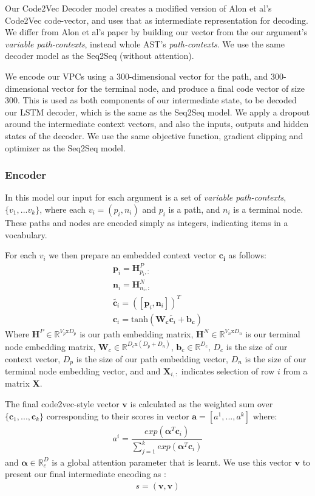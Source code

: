 Our Code2Vec Decoder model creates a modified version of Alon et al's \cite{alon_code2vec_2018} Code2Vec code-vector, and uses that as intermediate representation for decoding. We differ from Alon et al's paper by building our vector from the our argument's \textit{variable path-contexts}, instead whole AST's \textit{path-contexts}.
We use the same decoder model as the Seq2Seq (without attention).

We encode our VPCs using a 300-dimensional vector for the path, and 300-dimensional vector for the terminal node, and produce a final code vector of size 300.
This is used as both components of our intermediate state, to be decoded our LSTM decoder, which is the same as the Seq2Seq model.
We apply a dropout around the intermediate context vectors, and also the inputs, outputs and hidden states of the decoder. 
We use the same objective function, gradient clipping and optimizer as the Seq2Seq model.

\subsubsection{Encoder}

In this model our input for each argument is a set of \textit{variable path-contexts}, $\{v_1,...v_k\}$, where each $v_i = (p_i, n_i)$ and  $p_i$ is a path, and $n_i$ is a terminal node. These paths and nodes are encoded simply as integers, indicating items in a vocabulary.

For each $v_i$ we then prepare an embedded context vector $\mathbf{c_i}$ as follows:
\begin{align}
\textbf{p}_i = \mathbf{H}^P_{p_i,:}\\
\textbf{n}_i = \mathbf{H}^N_{n_i,:}\\
\tilde{\textbf{c}_i} = ([\textbf{p}_i , \textbf{n}_i])^T \\
\textbf{c}_i = \text{tanh}(\mathbf{W_c}\tilde{\textbf{c}_i}  + \mathbf{b_c})
\end{align}
Where  $\textbf{H}^P \in \mathbb{R}^{V_p\text{x}D_p}$ is our path embedding matrix, 
$\textbf{H}^N \in \mathbb{R}^{V_n\text{x}D_n}$ is our terminal node embedding matrix, 
$\textbf{W}_c \in \mathbb{R}^{D_c\text{x}(D_p+D_n)}$,
$\textbf{b}_c \in \mathbb{R}^{D_c}$,
$D_c$ is the size of our context vector,
$D_p$ is the size of our path embedding vector,
$D_n$ is the size of our terminal node embedding vector, and
and $\textbf{X}_{i,:}$ indicates selection of row $i$ from a matrix \textbf{X}.

The final code2vec-style vector $\textbf{v}$ is calculated as the weighted sum over  $\{\textbf{c}_1,...,\textbf{c}_k\}$ corresponding to their scores in vector $\textbf{a} = [a^1,...,a^k]$ where:
\begin{align}
    a^i = \dfrac{exp(\mathbf{\alpha}^{T}\mathbf{c}_i)}{\sum_{j=1}^kexp(\mathbf{\alpha}^{T}\mathbf{c}_i)}
\end{align}
and $\mathbf{\alpha} \in \mathbb{R}^D_c$ is a global attention parameter that is learnt.
We use this vector $\mathbf{v}$ to present our final intermediate encoding as :
\begin{align}
     s = (\mathbf{v}, \mathbf{v}) 
\end{align}

